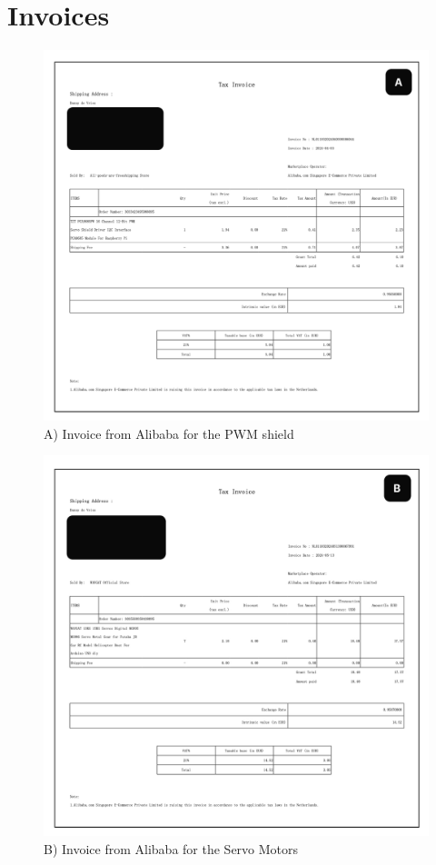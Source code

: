 \documentclass[a4paper]{article}
\begin{document}
\section*{Invoices}

\begin{figure}[h]
    \centering
    \includegraphics[width=1\textwidth]{pwm_shield.jpg}
    \caption{A) Invoice from Alibaba for the PWM shield}
    \label{fig:mesh1}
\end{figure}

\begin{figure}[h]
    \centering
    \includegraphics[width=1\textwidth]{servo_motors.jpg}
    \caption{B) Invoice from Alibaba for the Servo Motors}
    \label{fig:mesh1}
\end{figure}
\end{document}
